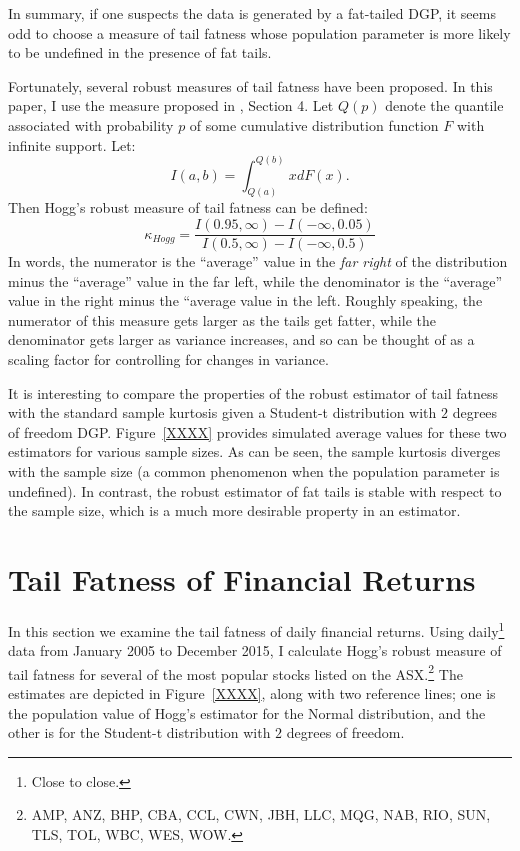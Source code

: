 \documentclass[12pt,a4paper]{amsart}
\renewcommand{\k}{\kappa}
\newcommand{\can}{\citeasnoun}							%
\begin{document}
In summary, if one suspects the data is generated by a fat-tailed DGP, it seems odd to choose a measure of tail fatness whose population parameter is more likely to be undefined in the presence of fat tails.

Fortunately, several robust measures of tail fatness have been proposed. In this paper, I use the measure proposed in \can{Hogg_(1974)}, Section 4. Let $Q(p)$ denote the quantile associated with probability $p$ of some cumulative distribution function $F$ with infinite support. Let:
\begin{equation}
I(a, b) = \int_{Q(a)}^{Q(b)} x dF(x) .
\end{equation}
Then Hogg's robust measure of tail fatness can be defined:
\begin{equation}
\k_{Hogg} = \frac{I(0.95, \infty) - I(-\infty, 0.05)}{I(0.5, \infty) - I(-\infty, 0.5)}
\end{equation}
In words, the numerator is the ``average'' value in the \emph{far right} of the distribution minus the ``average'' value in the \emph{}far left, while the denominator is the ``average'' value in the right minus the ``average value in the left. Roughly speaking, the numerator of this measure gets larger as the tails get fatter, while the denominator gets larger as variance increases, and so can be thought of as a scaling factor for controlling for changes in variance.

It is interesting to compare the properties of the robust estimator of tail fatness with the standard sample kurtosis given a Student-t distribution with $2$ degrees of freedom DGP. Figure~\ref{XXXX} provides simulated average values for these two estimators for various sample sizes. As can be seen, the sample kurtosis diverges with the sample size (a common phenomenon when the population parameter is undefined). In contrast, the robust estimator of fat tails is stable with respect to the sample size, which is a much more desirable property in an estimator.



\section{Tail Fatness of Financial Returns}\label{secFinReturnTailFatness}

In this section we examine the tail fatness of daily financial returns. Using daily\footnote{Close to close.} data from January 2005 to December 2015, I calculate Hogg's robust measure of tail fatness for several of the most popular stocks listed on the ASX.\footnote{AMP, ANZ, BHP, CBA, CCL, CWN, JBH, LLC, MQG, NAB, RIO, SUN, TLS, TOL, WBC, WES, WOW.} The estimates are depicted in Figure~\ref{XXXX}, along with two reference lines; one is the population value of Hogg's estimator for the Normal distribution, and the other is for the Student-t distribution with $2$ degrees of freedom.
\end{document}
